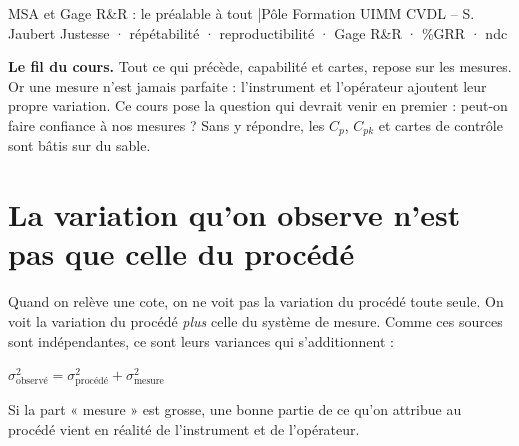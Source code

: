 \documentclass[11pt]{article}
\begin{document}
{MSA et Gage R\&R : le préalable à tout \quad|\quad Pôle Formation UIMM CVDL – S. Jaubert}
{Justesse · répétabilité · reproductibilité · Gage R\&R · \%GRR · ndc}

\begin{lead}
\textbf{\color{uimmblue}Le fil du cours.} Tout ce qui précède, capabilité et cartes, repose sur les mesures. Or une mesure n'est jamais parfaite : l'instrument et l'opérateur ajoutent leur propre variation. Ce cours pose la question qui devrait venir en premier : peut-on faire confiance à nos mesures ? Sans y répondre, les $C_p$, $C_{pk}$ et cartes de contrôle sont bâtis sur du sable.
\end{lead}

\section{La variation qu'on observe n'est pas que celle du procédé}

Quand on relève une cote, on ne voit pas la variation du procédé toute seule. On voit la variation du procédé \emph{plus} celle du système de mesure. Comme ces sources sont indépendantes, ce sont leurs variances qui s'additionnent :
\begin{formulebox}
$\displaystyle \sigma^2_{\text{observé}} = \sigma^2_{\text{procédé}} + \sigma^2_{\text{mesure}}$
\end{formulebox}

\begin{center}
\end{center}
\begin{center}\footnotesize\color{uimmgrey}Si la part « mesure » est grosse, une bonne partie de ce qu'on attribue au procédé vient en réalité de l'instrument et de l'opérateur.\end{center}
\end{document}
